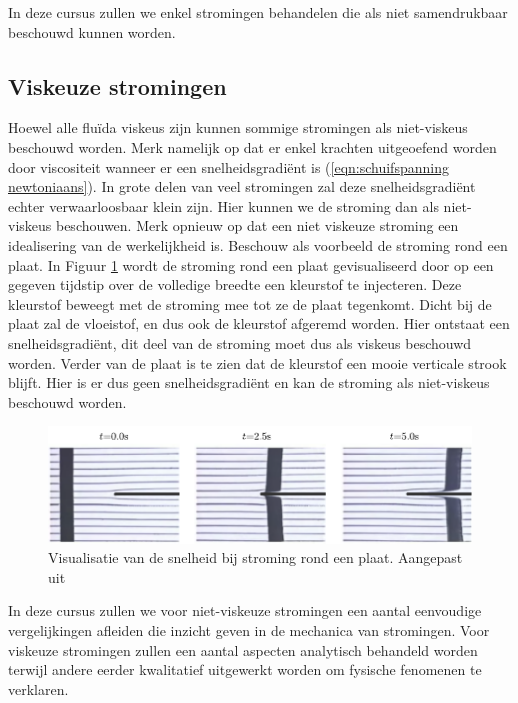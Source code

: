 In deze cursus zullen we enkel stromingen behandelen die als niet samendrukbaar beschouwd kunnen worden.

		\subsection{Viskeuze stromingen}
Hoewel alle fluïda viskeus zijn kunnen sommige stromingen als niet-viskeus beschouwd worden. Merk namelijk op dat er enkel krachten uitgeoefend worden door viscositeit wanneer er een snelheidsgradiënt is (\ref{eqn:schuifspanning newtoniaans}). In grote delen van veel stromingen zal deze snelheidsgradiënt echter verwaarloosbaar klein zijn. Hier kunnen we de stroming dan als niet-viskeus beschouwen. Merk opnieuw op dat een niet viskeuze stroming een idealisering van de werkelijkheid is. Beschouw als voorbeeld de stroming rond een plaat. In Figuur \ref{fig:grenslaag_visualisatie} wordt de stroming rond een plaat gevisualiseerd door op een gegeven tijdstip over de volledige breedte een kleurstof te injecteren. Deze kleurstof beweegt met de stroming mee tot ze de plaat tegenkomt. Dicht bij de plaat zal de vloeistof, en dus ook de kleurstof afgeremd worden. Hier ontstaat een snelheidsgradiënt, dit deel van de stroming moet dus als viskeus beschouwd worden. Verder van de plaat is te zien dat de kleurstof een mooie verticale strook blijft. Hier is er dus geen snelheidsgradiënt en kan de stroming als niet-viskeus beschouwd worden.
\begin{figure}[htb]
	\centering
	\includegraphics{fig/basisbegrippen/Grenslaag_visualisatie}
	\caption{Visualisatie van de snelheid bij stroming rond een plaat. Aangepast uit \cite{YoutubeBoundaryLayer1966} }
	\label{fig:grenslaag_visualisatie}
\end{figure}

In deze cursus zullen we voor niet-viskeuze stromingen een aantal eenvoudige vergelijkingen afleiden die inzicht geven in de mechanica van stromingen. Voor viskeuze stromingen zullen een aantal aspecten analytisch behandeld worden terwijl andere eerder kwalitatief uitgewerkt worden om fysische fenomenen te verklaren.